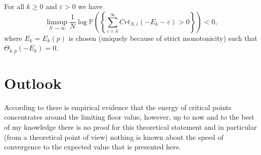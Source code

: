 \begin{theorem}
	For all $k\geq 0$ and $\varepsilon>0$ we have
	\begin{equation}\label{thm:2.15}
		\limsup_{N\rightarrow\infty}\frac{1}{N}\log\mathbb P\left(\left\{\sum_{i=k}^\infty Crt_{N,i}(-E_k-\varepsilon)>0\right\}\right)<0,
	\end{equation}
	where $E_k=E_k(p)$ is chosen (uniquely because of strict monotonicity) such that $\Theta_{k,p}(-E_k)=0$.
\end{theorem}

\section{Outlook}
According to \cite{LeCun2014lossvariance} there is empirical evidence that the energy of critical points concentrates around the limiting floor value, however, up to now and to the best of my knowledge there is no proof for this theoretical statement and in particular (from a theoretical point of view) nothing is known about the speed of convergence to the expected value that is presented here.












